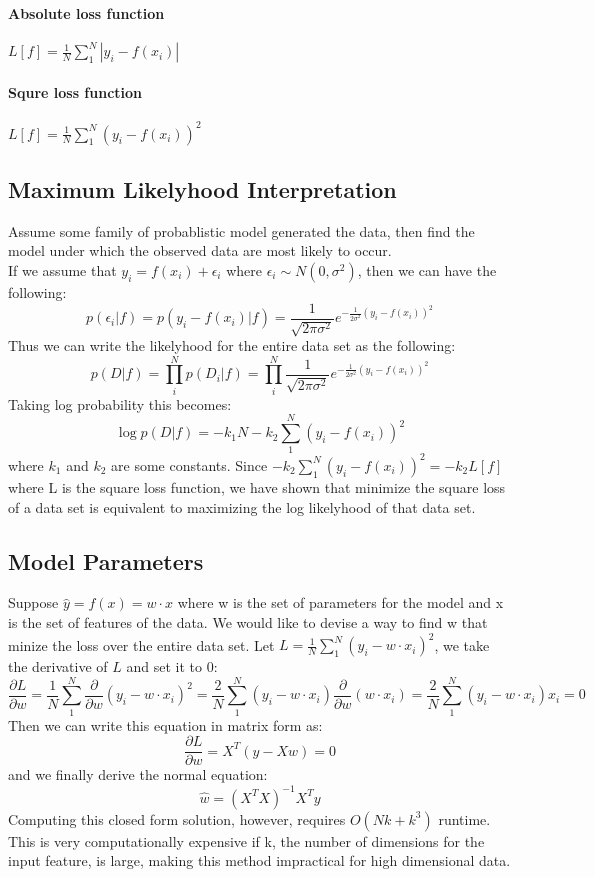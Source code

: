 \paragraph{Absolute loss function} $L[f]=\frac{1}{N}\sum_{1}^{N}|y_i-f(x_i)|$
\paragraph{Squre loss function} $L[f]=\frac{1}{N}\sum_{1}^{N}(y_i-f(x_i))^2$

\subsection{Maximum Likelyhood Interpretation}
Assume some family of probablistic model generated the data, then find the model under which the observed data are most likely to occur. \\ 
If we assume that $y_i=f(x_i)+\epsilon_i$ where $\epsilon_i \sim N(0, \sigma^2)$, then we can have the following:
$$p(\epsilon_i|f) = p(y_i-f(x_i)|f) = \frac{1}{\sqrt{2\pi\sigma^2}}e^{-\frac{1}{2\sigma^2}(y_i-f(x_i))^2}$$
Thus we can write the likelyhood for the entire data set as the following:
$$p(D|f)=\prod_{i}^{N}p(D_i|f)=\prod_{i}^{N}\frac{1}{\sqrt{2\pi\sigma^2}}e^{-\frac{1}{2\sigma^2}(y_i-f(x_i))^2}$$
Taking log probability this becomes:
$$\log{p(D|f)} = -k_1N - k_2\sum_{1}^{N}(y_i-f(x_i))^2$$
where $k_1$ and $k_2$ are some constants. Since $- k_2\sum_{1}^{N}(y_i-f(x_i))^2=-k_2L[f]$ where L is the square loss function, we have shown that minimize the square loss of a data set is equivalent to maximizing the log likelyhood of that data set.

\subsection{Model Parameters}
Suppose $\hat{y}=f(x)=w \cdot x$ where w is the set of parameters for the model and x is the set of features of the data. We would like to devise a way to find w that minize the loss over the entire data set. Let $L=\frac{1}{N}\sum_{1}^{N}(y_i - w \cdot x_i)^2$, we take the derivative of $L$ and set it to 0:
$$\frac{\partial L}{\partial w} = \frac{1}{N}\sum_{1}^{N}\frac{\partial}{\partial w}(y_i - w \cdot x_i)^2 = \frac{2}{N}\sum_{1}^{N}(y_i - w \cdot x_i) \frac{\partial}{\partial w}(w \cdot x_i) = \frac{2}{N}\sum_{1}^{N}(y_i - w \cdot x_i)x_i = 0$$
Then we can write this equation in matrix form as:
$$\frac{\partial L}{\partial w} = X^T(y-Xw) = 0$$
and we finally derive the normal equation:
$$\hat{w}=(X^TX)^{-1}X^Ty$$
Computing this closed form solution, however, requires  $O(Nk + k^3)$ runtime. This is very computationally expensive if k, the number of dimensions for the input feature, is large, making this method impractical for high dimensional data.

